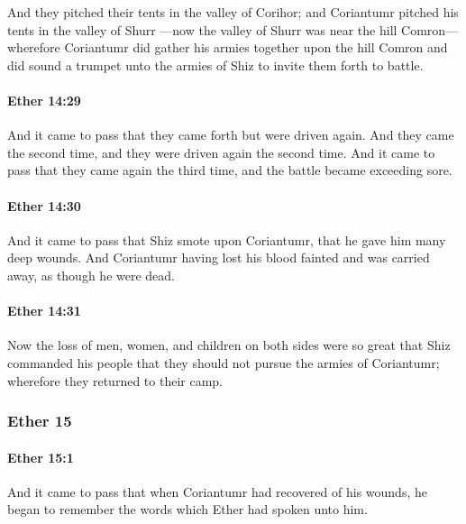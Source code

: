 			And they pitched their tents in the valley of Corihor;
			and Coriantumr pitched his tents in the valley of Shurr
			---now the valley of Shurr was near the hill Comron---
			wherefore Coriantumr did gather his armies together upon the hill Comron
			and did sound a trumpet unto the armies of Shiz to invite them forth to battle.

		\paragraph{Ether 14:29} %
			\label{ETHER-14-29}

			And it came to pass that they came forth but were driven again.
			And they came the second time, and they were driven again the second time.
			And it came to pass that they came again the third time,
			and the battle became exceeding sore.

		\paragraph{Ether 14:30} %
			\label{ETHER-14-30}

			And it came to pass that Shiz smote upon Coriantumr,
			that he gave him many deep wounds.
			And Coriantumr having lost his blood fainted
			and was carried away, as though he were dead.

		\paragraph{Ether 14:31} %
			\label{ETHER-14-31}

			Now the loss of men, women, and children on both sides were so great
			that Shiz commanded his people
			that they should not pursue the armies of Coriantumr;
			wherefore they returned to their camp.

	\subsubsection{Ether 15} %
		\label{ETHER-15}
		
		\paragraph{Ether 15:1} %
			\label{ETHER-15-1}

			And it came to pass that when Coriantumr had recovered of his wounds,
			he began to remember the words which Ether had spoken unto him.

